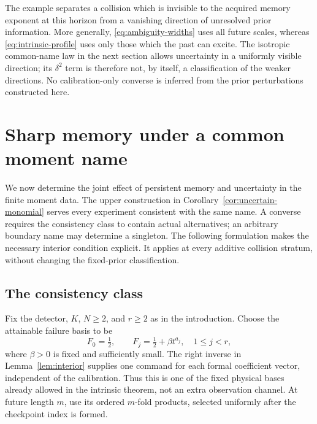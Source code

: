 \documentclass[11pt]{amsart}
\theoremstyle{definition}\newtheorem{definition}[theorem]{Definition}
\theoremstyle{remark}\newtheorem{remark}[theorem]{Remark}
\begin{document}
The example separates a collision which is invisible to the acquired
memory exponent at this horizon from a vanishing direction of unresolved
prior information. More generally, \eqref{eq:ambiguity-widths} uses
all future scales, whereas \eqref{eq:intrinsic-profile} uses only those
which the past can excite. The isotropic common-name law in the next
section allows uncertainty in a uniformly visible direction; its
$\delta^2$ term is therefore not, by itself, a classification of the
weaker directions. No calibration-only converse is inferred from the
prior perturbations constructed here.

\section{Sharp memory under a common moment name}
\label{sec:uncertainty-geometry}
We now determine the joint effect of persistent memory and uncertainty in
the finite moment data. The upper construction in
Corollary~\ref{cor:uncertain-monomial} serves every experiment consistent
with the same name. A converse requires the consistency class to contain
actual alternatives; an arbitrary boundary name may determine a singleton.
The following formulation makes the necessary interior condition explicit.
It applies at every additive collision stratum, without changing the
fixed-prior classification.

\subsection{The consistency class}
Fix the detector, $K$, $N\ge2$, and $r\ge2$ as in the introduction.
Choose the attainable failure basis to be
\begin{equation}\label{eq:uncertainty-probe-basis}
 F_0=\tfrac12,\qquad F_j=\tfrac12+\beta t^{a_j},\quad 1\le j<r,
\end{equation}
where $\beta>0$ is fixed and sufficiently small. The right inverse in
Lemma~\ref{lem:interior} supplies one command for each formal coefficient
vector, independent of the calibration. Thus this is one of the fixed
physical bases already allowed in the intrinsic theorem, not an extra
observation channel. At future length $m$, use its ordered $m$-fold
products, selected uniformly after the checkpoint index is formed.
\end{document}
